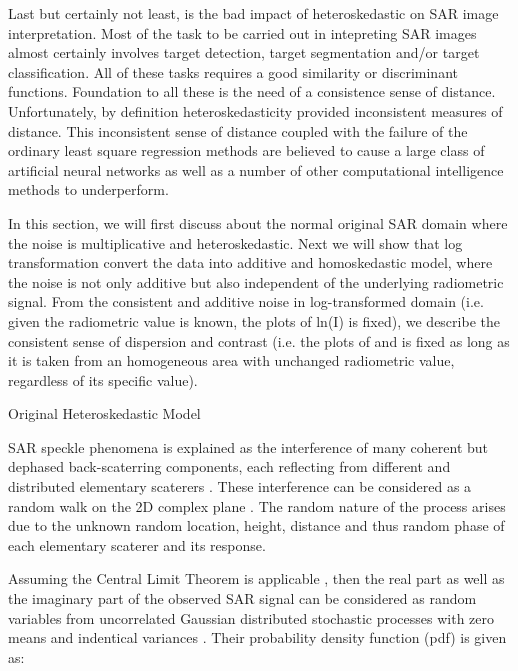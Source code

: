 Last but certainly not least, is the bad impact of heteroskedastic on SAR image interpretation. Most of the task to be carried out in intepreting SAR images almost certainly involves target detection, target segmentation and/or target classification. All of these tasks requires a good similarity or discriminant functions. Foundation to all these is the need of a consistence sense of distance. Unfortunately, by definition heteroskedasticity provided inconsistent measures of distance. This inconsistent sense of distance coupled with the failure of the ordinary least square regression methods are believed to cause a large class of artificial neural networks as well as a number of other computational intelligence methods to underperform.







In this section, we will first discuss about the normal original SAR domain where the noise is multiplicative and heteroskedastic.
Next we will show that log transformation convert the data into additive and homoskedastic model, where the noise is not only additive but also independent of the underlying radiometric signal.
From the consistent and additive noise in log-transformed domain (i.e. given the radiometric value is known, the plots of ln(I) is fixed), we describe the consistent sense of dispersion and contrast (i.e. the plots of  and  is fixed as long as it is taken from an homogeneous area with unchanged radiometric value, regardless of its specific value). 


Original Heteroskedastic Model

SAR speckle phenomena is explained as the interference of many coherent but dephased back-scaterring components, each reflecting from different and distributed elementary scaterers . These interference can be considered as a random walk on the 2D complex plane .  The random nature of the process arises due to the unknown random location, height, distance and thus random phase of each elementary scaterer and its response.

Assuming the Central Limit Theorem is applicable , then the real part  as well as the imaginary part  of the observed SAR signal  can be considered as random variables from uncorrelated Gaussian distributed stochastic processes with zero means and indentical variances   . Their probability density function (pdf) is given as:






